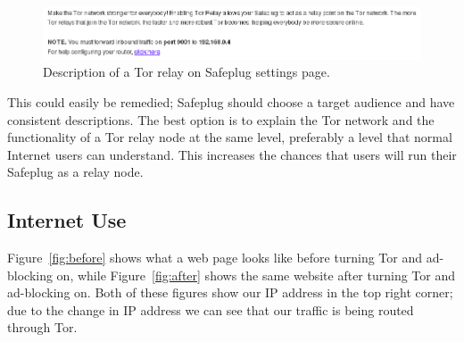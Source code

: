\begin{figure}[th]
\begin{center}
\includegraphics[width=\textwidth]{relaydesc.png}
\caption{Description of a Tor relay on Safeplug settings page.}
\label{fig:relaydesc}
\end{center}
\end{figure}

This could easily be remedied; Safeplug should choose a target audience and have consistent descriptions.  The best option is to explain the Tor network and the functionality of a Tor relay node at the same level, preferably a level that normal Internet users can understand.  This increases the chances that users will run their Safeplug as a relay node.

\subsection{Internet Use}
\label{inetuse}
Figure~\ref{fig:before} shows what a web page looks like before turning Tor and ad-blocking on, while Figure~\ref{fig:after} shows the same website after turning Tor and ad-blocking on.  Both of these figures show our IP address in the top right corner; due to the change in IP address we can see that our traffic is being routed through Tor.  

